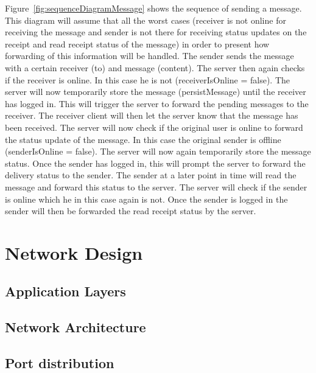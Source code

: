 Figure~\ref{fig:sequenceDiagramMessage} shows the sequence of sending a message.
This diagram will assume that all the worst cases (receiver is not online for receiving the message and sender is not
there for receiving status updates on the receipt and read receipt status of the message) in order to present how
forwarding of this information will be handled.
The sender sends the message with a certain receiver (to) and message (content).
The server then again checks if the receiver is online.
In this case he is not (receiverIsOnline = false).
The server will now temporarily store the message (persistMessage) until the receiver has logged in.
This will trigger the server to forward the pending messages to the receiver.
The receiver client will then let the server know that the message has been received.
The server will now check if the original user is online to forward the status update of the message.
In this case the original sender is offline (senderIsOnline = false).
The server will now again temporarily store the message status.
Once the sender has logged in, this will prompt the server to forward the delivery status to the sender.
The sender at a later point in time will read the message and forward this status to the server.
The server will check if the sender is online which he in this case again is not.
Once the sender is logged in the sender will then be forwarded the read receipt status by the server.

\section{Network Design}\label{sec:network-design}

\subsection{Application Layers}\label{subsec:application-layers}

\subsection{Network Architecture}\label{subsec:network-architecture}

\subsection{Port distribution}\label{subsec:port-distribution}

